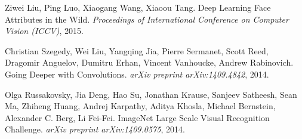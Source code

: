 \documentclass[12pt, a4paper]{article}
\begin{document}
\begin{thebibliography}{9}
	Ziwei Liu, Ping Luo, Xiaogang Wang, Xiaoou Tang. Deep Learning Face Attributes in the Wild. \textit{Proceedings of International Conference on Computer Vision (ICCV)}, 2015.
	
	Christian Szegedy, Wei Liu, Yangqing Jia, Pierre Sermanet, Scott Reed, Dragomir Anguelov, Dumitru Erhan, Vincent Vanhoucke, Andrew Rabinovich. Going Deeper with Convolutions. \textit{arXiv preprint arXiv:1409.4842}, 2014.
	
	Olga Russakovsky, Jia Deng, Hao Su, Jonathan Krause, Sanjeev Satheesh, Sean Ma, Zhiheng Huang, Andrej Karpathy, Aditya Khosla, Michael Bernstein, Alexander C. Berg, Li Fei-Fei. ImageNet Large Scale Visual Recognition Challenge. \textit{arXiv preprint arXiv:1409.0575}, 2014.
\end{thebibliography}
\end{document}
